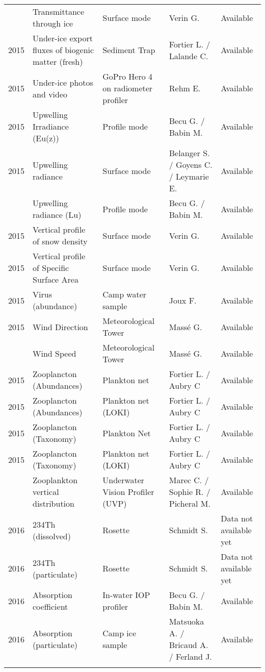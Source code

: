 \documentclass[]{article}
\begin{document}
\begin{landscape}
\begin{longtable}{rllll}
\addlinespace
2015 & Transmittance through ice & Surface mode & Verin G. & Available\\
2015 & Under-ice export fluxes of biogenic matter (fresh) & Sediment Trap & Fortier L. / Lalande C. & Available\\
2015 & Under-ice photos and video & GoPro Hero 4 on radiometer profiler & Rehm E. & Available\\
2015 & Upwelling Irradiance (Eu(z)) & Profile mode & Becu G. / Babin M. & Available\\
2015 & Upwelling radiance & Surface mode & Belanger S. / Goyens C. / Leymarie E. & Available\\
\addlinespace
2015 & Upwelling radiance (Lu) & Profile mode & Becu G. / Babin M. & Available\\
2015 & Vertical profile of snow density & Surface mode & Verin G. & Available\\
2015 & Vertical profile of Specific Surface Area & Surface mode & Verin G. & Available\\
2015 & Virus (abundance) & Camp water sample & Joux F. & Available\\
2015 & Wind Direction & Meteorological Tower & Massé G. & Available\\
\addlinespace
2015 & Wind Speed & Meteorological Tower & Massé G. & Available\\
2015 & Zooplancton (Abundances) & Plankton net & Fortier L. / Aubry C & Available\\
2015 & Zooplancton (Abundances) & Plankton net (LOKI) & Fortier L. / Aubry C & Available\\
2015 & Zooplancton (Taxonomy) & Plankton Net & Fortier L. / Aubry C & Available\\
2015 & Zooplancton (Taxonomy) & Plankton net (LOKI) & Fortier L. / Aubry C & Available\\
\addlinespace
2015 & Zooplankton vertical distribution & Underwater Vision Profiler (UVP) & Marec C. / Sophie R. / Picheral M. & Available\\
2016 & 234Th (dissolved) & Rosette & Schmidt S. & Data not available yet\\
2016 & 234Th (particulate) & Rosette & Schmidt S. & Data not available yet\\
2016 & Absorption coefficient & In-water IOP profiler & Becu G. / Babin M. & Available\\
2016 & Absorption (particulate) & Camp ice sample & Matsuoka A. / Bricaud A. / Ferland J. & Available\\
\addlinespace

\end{longtable}
\end{landscape}
\end{document}
